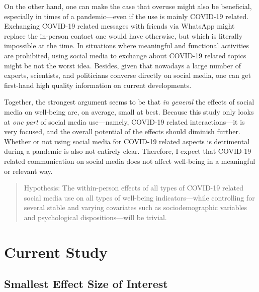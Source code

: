 \documentclass[
  english,
  man,mask,floatsintext]{apa6}
\begin{document}
On the other hand, one can make the case that overuse might also be beneficial, especially in times of a pandemic---even if the use is mainly COVID-19 related.
Exchanging COVID-19 related messages with friends via WhatsApp might replace the in-person contact one would have otherwise, but which is literally impossible at the time.
In situations where meaningful and functional activities are prohibited, using social media to exchange about COVID-19 related topics might be not the worst idea.
Besides, given that nowadays a large number of experts, scientists, and politicians converse directly on social media, one can get first-hand high quality information on current developments.

Together, the strongest argument seems to be that \emph{in general} the effects of social media on well-being are, on average, small at best.
Because this study only looks at \emph{one part} of social media use---namely, COVID-19 related interactions---it is very focused, and the overall potential of the effects should diminish further.
Whether or not using social media for COVID-19 related aspects is detrimental during a pandemic is also not entirely clear.
Therefore, I expect that COVID-19 related communication on social media does not affect well-being in a meaningful or relevant way.

\begin{quote}
Hypothesis: The within-person effects of all types of COVID-19 related social media use on all types of well-being indicators---while controlling for several stable and varying covariates such as sociodemographic variables and psychological dispositions---will be trivial.
\end{quote}

\hypertarget{current-study}{%
\section{Current Study}\label{current-study}}

\hypertarget{smallest-effect-size-of-interest}{%
\subsection{Smallest Effect Size of Interest}\label{smallest-effect-size-of-interest}}
\end{document}
